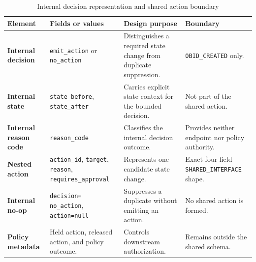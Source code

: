 \begin{table}[H]
\centering
\caption{Internal decision representation and shared action boundary}
\label{tab:design-output-boundary}

\begingroup
\footnotesize
\setlength{\tabcolsep}{3.5pt}
\renewcommand{\arraystretch}{1.14}

\begin{tabularx}{\textwidth}{
  @{}
  L{0.17\textwidth}
  L{0.24\textwidth}
  L{0.29\textwidth}
  Y
  @{}
}
\toprule
\textbf{Element}
&
\textbf{Fields or values}
&
\textbf{Design purpose}
&
\textbf{Boundary}
\\
\midrule

\textbf{Internal decision}
&
\texttt{emit\_action} or \texttt{no\_action}
&
Distinguishes a required state change from duplicate suppression.
&
\texttt{OBID\_CREATED} only.
\\
\addlinespace[2pt]

\textbf{Internal state}
&
\texttt{state\_before}, \texttt{state\_after}
&
Carries explicit state context for the bounded decision.
&
Not part of the shared action.
\\
\addlinespace[2pt]

\textbf{Internal reason code}
&
\texttt{reason\_code}
&
Classifies the internal decision outcome.
&
Provides neither endpoint nor policy authority.
\\
\addlinespace[2pt]

\textbf{Nested action}
&
\texttt{action\_id}, \texttt{target}, \texttt{reason},
\texttt{requires\_approval}
&
Represents one candidate state change.
&
Exact four-field
\texttt{SHARED\_}\newline\texttt{INTERFACE} shape.
\\
\addlinespace[2pt]

\textbf{Internal no-op}
&
\texttt{decision=}\newline
\texttt{no\_action},\newline
\texttt{action=null}
&
Suppresses a duplicate without emitting an action.
&
No shared action is formed.
\\
\addlinespace[2pt]

\textbf{Policy metadata}
&
Held action, released action, and policy outcome.
&
Controls downstream authorization.
&
Remains outside the shared schema.
\\

\bottomrule
\end{tabularx}
\endgroup
\end{table}

